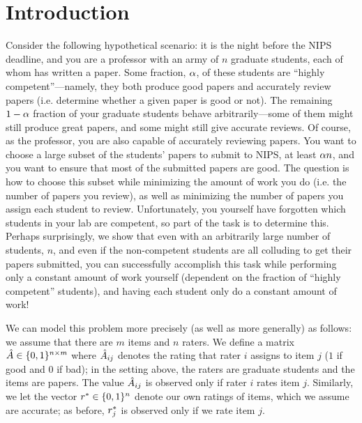 \section{Introduction}
\label{sec:intro}

Consider the following hypothetical scenario: it is the night before the 
NIPS deadline, and you are a professor with an army of $n$ graduate students, 
each of whom has written a paper.  Some fraction, $\alpha$, of these 
students are ``highly competent''---namely, they both produce good papers and 
accurately review papers (i.e. determine whether a given paper is good 
or not).  The remaining $1-\alpha$ fraction of your graduate students 
behave arbitrarily---some of them might still produce great papers, and some 
might still give accurate reviews.  Of course, as the professor, you are also 
capable of accurately reviewing papers.  You want to choose a large subset of 
the students' papers to submit to NIPS, at least $\alpha n$, and you want 
to ensure that most of the submitted papers are good.  The question is how to 
choose this subset while minimizing the amount of work you do (i.e. the number 
of papers you review), as well as minimizing the number of papers you assign 
each student to review. Unfortunately, you yourself have forgotten which students 
in your lab are competent, so part of the task is to determine this.
%
Perhaps surprisingly, we show that even with an arbitrarily large number of 
students, $n$, and even if the non-competent students are all colluding to 
get their papers submitted, you can successfully accomplish this task while 
performing only a constant amount of work yourself (dependent on the fraction 
of ``highly competent'' students), and having each student only do a constant 
amount of work!

We can model this problem more precisely (as well as more generally) as follows: 
we assume that there are $m$ items and $n$ raters. We define a matrix 
$\hat{A} \in \{0,1\}^{n \times m}$ where $\hat{A}_{ij}$ denotes the rating that 
rater $i$ assigns to item $j$ ($1$ if good and $0$ if bad); in the setting above, 
the raters are graduate students and the items are papers. 
The value $\hat{A}_{ij}$ is observed only if rater $i$ rates item $j$. 
Similarly, we let the vector $r^* \in \{0,1\}^n$ denote 
our own ratings of items, which we assume are accurate; as before, 
$r^*_{j}$ is observed only if we rate item $j$.

